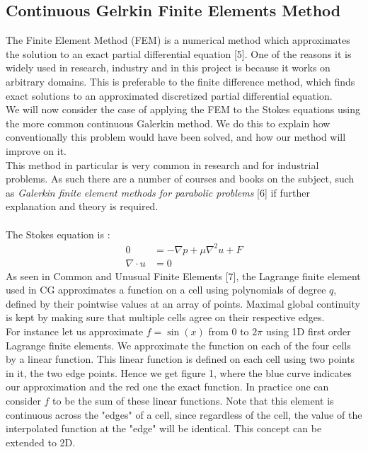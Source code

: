 \documentclass[11pt,twoside,a4paper]{article}
\begin{document}
\subsection{Continuous Gelrkin Finite Elements Method}
The Finite Element Method (FEM) is a numerical method which approximates the solution to an exact partial differential equation [5]. One of the reasons it is widely used in research, industry and in this project is because it works on arbitrary domains. This is preferable to the finite difference method, which finds exact solutions to an approximated discretized partial differential equation.\\
We will now consider the case of applying the FEM to the Stokes equations using the more common continuous Galerkin method. We do this to explain how conventionally this problem would have been solved, and how our method will improve on it.\\
This method in particular is very common in research and for industrial problems. As such there are a number of courses and books on the subject, such as \textit{Galerkin finite element methods for parabolic problems} [6] if further explanation and theory is required.\\
\\
The Stokes equation is :
\begin{align}
0 &= -\nabla p + \mu \nabla^2 u + F \\
\nabla \cdot u &= 0
\end{align}
As seen in Common and Unusual Finite Elements [7], the Lagrange finite element used in CG approximates a function on a cell using polynomials of degree $q$, defined by their pointwise values at an array of points. Maximal global continuity is kept by making sure that multiple cells agree on their respective edges.\\
For instance let us approximate $f = \sin(x)$ from $0$ to $2 \pi$ using 1D first order Lagrange finite elements. We approximate the function on each of the four cells by a linear function. This linear function is defined on each cell using two points in it, the two edge points. Hence we get figure 1, where the blue curve indicates our approximation and the red one the exact function. In practice one can consider $f$ to be the sum of these linear functions. Note that this element is continuous across the "edges" of a cell, since regardless of the cell, the value of the interpolated function at the "edge" will be identical. This concept can be extended to 2D.\\
\end{document}
